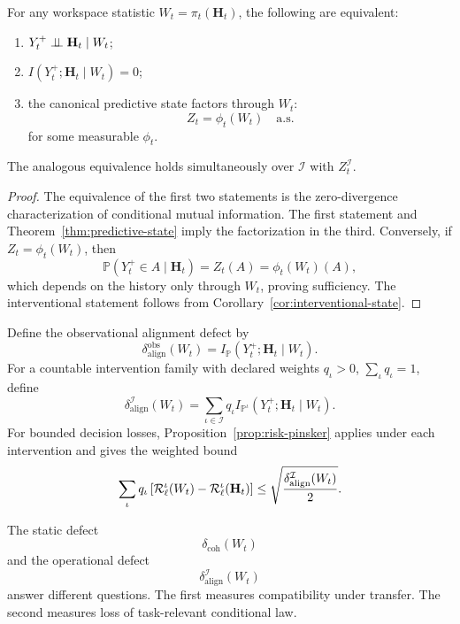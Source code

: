 \begin{theorem}\label{thm:alignment-criterion}
For any workspace statistic \(W_t=\pi_t(\mathbf H_t)\), the following are
equivalent:
\begin{enumerate}
\item \(Y_t^+\perp\!\!\!\perp\mathbf H_t\mid W_t\);
\item \(I(Y_t^+;\mathbf H_t\mid W_t)=0\);
\item the canonical predictive state factors through \(W_t\):
\[
Z_t=\phi_t(W_t)
\quad\text{a.s.}
\]
for some measurable \(\phi_t\).
\end{enumerate}
The analogous equivalence holds simultaneously over \(\mathcal I\) with
\(Z_t^{\mathcal I}\).
\end{theorem}

\begin{proof}
The equivalence of the first two statements is the zero-divergence
characterization of conditional mutual information. The first statement and
Theorem~\ref{thm:predictive-state} imply the factorization in the third.
Conversely, if \(Z_t=\phi_t(W_t)\), then
\[
\mathbb P(Y_t^+\in A\mid\mathbf H_t)
=Z_t(A)
=\phi_t(W_t)(A),
\]
which depends on the history only through \(W_t\), proving sufficiency. The
interventional statement follows from
Corollary~\ref{cor:interventional-state}.
\end{proof}

Define the observational alignment defect by
\[
\boxed{
\delta_{\mathrm{align}}^{\mathrm{obs}}(W_t)
=
I_{\mathbb P}(Y_t^+;\mathbf H_t\mid W_t).
}
\]
For a countable intervention family with declared weights
\(q_\iota>0\), \(\sum_\iota q_\iota=1\), define
\[
\boxed{
\delta_{\mathrm{align}}^{\mathcal I}(W_t)
=
\sum_{\iota\in\mathcal I}
q_\iota
I_{\mathbb P^\iota}
(Y_t^+;\mathbf H_t\mid W_t).
}
\]
For bounded decision losses, Proposition~\ref{prop:risk-pinsker} applies under
each intervention and gives the weighted bound
\[
\sum_{\iota}q_\iota
\left[
\mathcal R_\ell^{\iota}(W_t)
-
\mathcal R_\ell^{\iota}(\mathbf H_t)
\right]
\leq
\sqrt{\frac{
\delta_{\mathrm{align}}^{\mathcal I}(W_t)}{2}}.
\]


The static defect
\[
\delta_{\mathrm{coh}}(W_t)
\]
and the operational defect
\[
\delta_{\mathrm{align}}^{\mathcal I}(W_t)
\]
answer different questions. The first measures compatibility under transfer.
The second measures loss of task-relevant conditional law.


